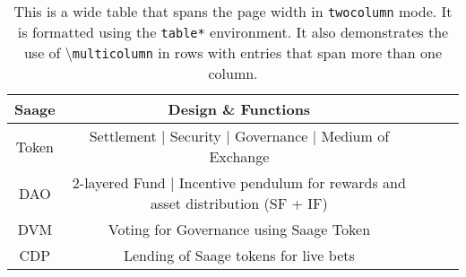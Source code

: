 \documentclass[%
 aapm,
 mph,%
 amsmath,amssymb,
 reprint,%
]{revtex4-2}
\begin{document}
\begin{table*}
\caption{\label{tab:table3}This is a wide table that spans the page
width in \texttt{twocolumn} mode. It is formatted using the
\texttt{table*} environment. It also demonstrates the use of
\textbackslash\texttt{multicolumn} in rows with entries that span
more than one column.}
\begin{ruledtabular}
\begin{tabular}{ccccc}
Saage & Design \& Functions \\
\hline
 Token & Settlement | Security | Governance | Medium of Exchange\\
 DAO & 2-layered Fund | Incentive pendulum for rewards and asset distribution (SF + IF)\\
 DVM & Voting for Governance using Saage Token\\
CDP & Lending of Saage tokens for live bets
\hline




\end{tabular}
\end{ruledtabular}
\end{table*}

%
\end{document}
